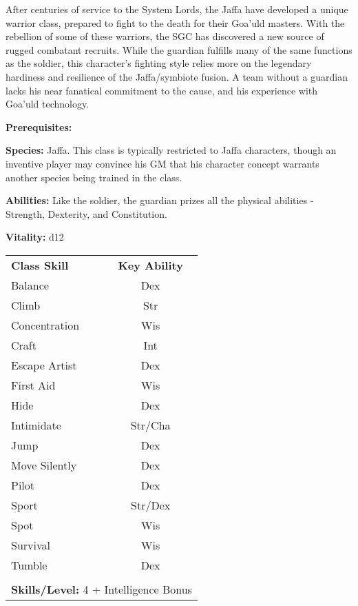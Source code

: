\begin{multicols}{2}

After centuries of service to the System Lords, the Jaffa have developed a unique warrior class, prepared to fight to the death for their Goa'uld masters. With the rebellion of some of these warriors, the SGC has discovered a new source of rugged combatant recruits. While the guardian fulfills many of the same functions as the soldier, this character's fighting style relies more on the legendary hardiness and resilience of the Jaffa/symbiote fusion. A team without a guardian lacks his near fanatical commitment to the cause, and his experience with Goa'uld technology.

\textbf{Prerequisites:} 
\begin{description*}
\item[\hspace{1.5cm}\textbf{Species:}] Jaffa. This class is typically restricted to Jaffa characters, though an inventive player may convince his GM that his character concept warrants another species being trained in the class.
\end{description*}

\textbf{Abilities:} Like the soldier, the guardian prizes all the physical abilities - Strength, Dexterity, and Constitution.

\textbf{Vitality:} d12

\end{multicols}

\begin{table}[htb]
\raggedright
\begin{tabular}{l c}
\textbf{Class Skill} & \textbf{Key Ability}\\

Balance & Dex\\
Climb & Str\\
Concentration & Wis\\
Craft & Int\\
Escape Artist & Dex\\
First Aid & Wis\\
Hide & Dex\\
Intimidate & Str/Cha\\
Jump & Dex\\
Move Silently & Dex\\
Pilot & Dex\\
Sport & Str/Dex\\
Spot & Wis\\
Survival & Wis\\
Tumble & Dex\\

\multicolumn{2}{l}{\cellcolor{white}}\\
\multicolumn{2}{l}{\cellcolor{white}\textbf{Skills/Level:} 4 + Intelligence Bonus}\\
\end{tabular}
\end{table}

